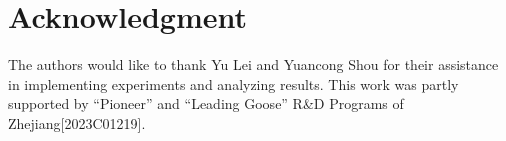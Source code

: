 \documentclass[10pt, conference, compsocconf]{IEEEtran}
\begin{document}




\section*{Acknowledgment}
The authors would like to thank Yu Lei and Yuancong Shou for their assistance in implementing experiments and analyzing results. This work was partly supported by “Pioneer” and “Leading Goose” R\&D Programs of Zhejiang[2023C01219].

\newpage









%








% 

% 


\end{document}
